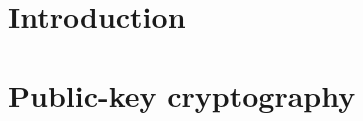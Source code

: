 \documentclass[dawn, draft]{lectures2}
\begin{document}
    \maketitle
    
    \section{Introduction}
    

    \section{Public-key cryptography}
    

    \printbibliography
\end{document}
